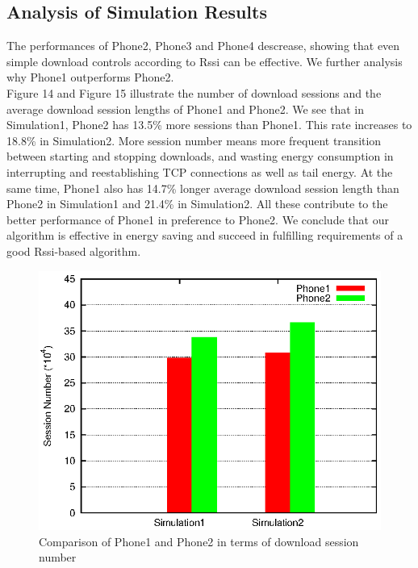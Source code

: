 \documentclass[journal]{IEEEtran}
\begin{document}
\subsection{Analysis of Simulation Results}
The performances of Phone2, Phone3 and Phone4 descrease, showing that even simple download controls according to Rssi can be effective.
We further analysis why Phone1 outperforms Phone2.
\\
\indent
Figure 14 and Figure 15 illustrate the number of download sessions and the average download session lengths of Phone1 and Phone2. We see that in Simulation1, 
Phone2 has 13.5\% more sessions than Phone1. This rate increases to 18.8\% in Simulation2. More session number
means more frequent transition between starting and stopping downloads, and wasting energy consumption in 
interrupting and reestablishing TCP connections as well as tail energy. 
At the same time, Phone1 also has 14.7\% longer average download session length than Phone2 in Simulation1 and 21.4\% in Simulation2. 
All these contribute to the better performance of Phone1 in preference to Phone2.
We conclude that our algorithm is effective in energy saving and succeed in fulfilling requirements of a good Rssi-based algorithm.
\begin{figure}
\centering
\includegraphics[scale=0.85]{comparison_session_number.eps}
\caption{Comparison of Phone1 and Phone2 in terms of download session number}
\end{figure}
\end{document}

